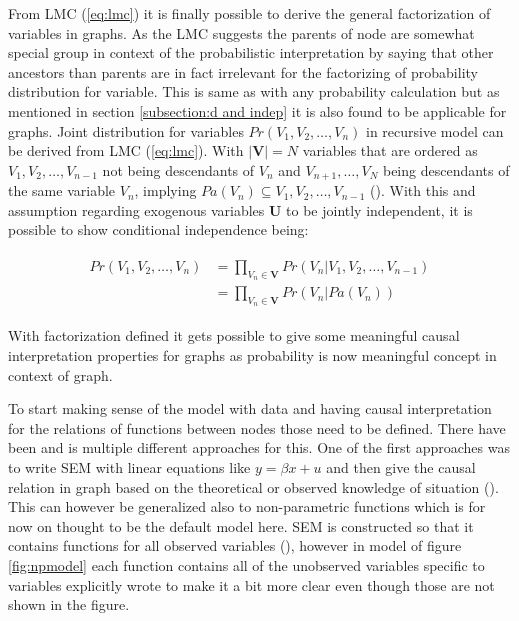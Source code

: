 \documentclass[main=english,12pt,a4paper,pdftex,econ,utf8]{aaltothesis}
\newcommand{\pa}[1]{Pa(#1)}
\newcommand{\vars}{\bm{V}}
\newcommand{\unobs}{\bm{U}}
\begin{document}
From LMC (\ref{eq:lmc}) it is finally possible to derive the general factorization of variables in graphs. As the LMC suggests the parents of node are somewhat special group in context of the probabilistic interpretation by saying that other ancestors than parents are in fact irrelevant for the factorizing of probability distribution for variable. This is same as with any probability calculation but as mentioned in section \ref{subsection:d and indep} it is also found to be applicable for graphs. Joint distribution for variables $Pr(V_1,V_2,\ldots,V_n)$ in recursive model can be derived from LMC (\ref{eq:lmc}). With $|\vars|=N$ variables that are ordered as $V_1,V_2,\ldots,V_{n-1}$ not being descendants of $V_n$ and $V_{n+1},\ldots,V_{N}$ being descendants of the same variable $V_n$, implying $\pa{V_n}\subseteq V_1,V_2,\ldots,V_{n-1}$ (\cite{Heckman2015}). With this and assumption regarding exogenous variables $\unobs$ to be jointly independent, it is possible to show conditional independence being:

\begin{align} \label{eq:factor}
    \begin{split}
        Pr(V_1,V_2,\ldots,V_{n})&=\prod_{V_{n}\in\vars}Pr(V_{n}|V_1,V_2,\ldots,V_{n-1}) \\
        &=\prod_{V_{n}\in\vars}Pr(V_{n}|\pa{V_{n}})
    \end{split}
\end{align}

\noindent With factorization defined it gets possible to give some meaningful causal interpretation properties for graphs as probability is now meaningful concept in context of graph.

To start making sense of the model with data and having causal interpretation for the relations of functions between nodes those need to be defined. There have been and is multiple different approaches for this. One of the first approaches was to write SEM with linear equations like $y=\beta x+u$ and then give the causal relation in graph based on the theoretical or observed knowledge of situation (\cite{Wright1921}). This can however be generalized also to non-parametric functions which is for now on thought to be the default model here. SEM is constructed so that it contains functions for all observed variables (\cite{Pearl2008}), however in model of figure \ref{fig:npmodel} each function contains all of the unobserved variables specific to variables explicitly wrote to make it a bit more clear even though those are not shown in the figure.
\end{document}
